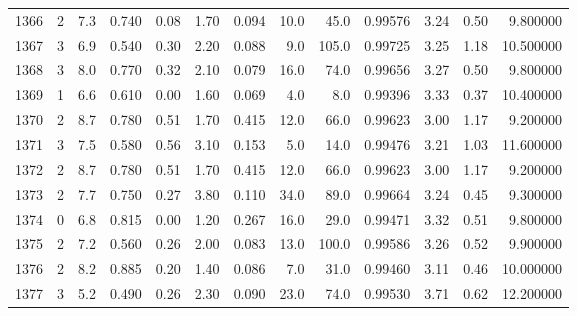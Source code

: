 \begin{tabular}{lrrrrrrrrrrrr}
1366 &        2 &            7.3 &             0.740 &         0.08 &            1.70 &      0.094 &                 10.0 &                  45.0 &  0.99576 &  3.24 &       0.50 &   9.800000 \\
1367 &        3 &            6.9 &             0.540 &         0.30 &            2.20 &      0.088 &                  9.0 &                 105.0 &  0.99725 &  3.25 &       1.18 &  10.500000 \\
1368 &        3 &            8.0 &             0.770 &         0.32 &            2.10 &      0.079 &                 16.0 &                  74.0 &  0.99656 &  3.27 &       0.50 &   9.800000 \\
1369 &        1 &            6.6 &             0.610 &         0.00 &            1.60 &      0.069 &                  4.0 &                   8.0 &  0.99396 &  3.33 &       0.37 &  10.400000 \\
1370 &        2 &            8.7 &             0.780 &         0.51 &            1.70 &      0.415 &                 12.0 &                  66.0 &  0.99623 &  3.00 &       1.17 &   9.200000 \\
1371 &        3 &            7.5 &             0.580 &         0.56 &            3.10 &      0.153 &                  5.0 &                  14.0 &  0.99476 &  3.21 &       1.03 &  11.600000 \\
1372 &        2 &            8.7 &             0.780 &         0.51 &            1.70 &      0.415 &                 12.0 &                  66.0 &  0.99623 &  3.00 &       1.17 &   9.200000 \\
1373 &        2 &            7.7 &             0.750 &         0.27 &            3.80 &      0.110 &                 34.0 &                  89.0 &  0.99664 &  3.24 &       0.45 &   9.300000 \\
1374 &        0 &            6.8 &             0.815 &         0.00 &            1.20 &      0.267 &                 16.0 &                  29.0 &  0.99471 &  3.32 &       0.51 &   9.800000 \\
1375 &        2 &            7.2 &             0.560 &         0.26 &            2.00 &      0.083 &                 13.0 &                 100.0 &  0.99586 &  3.26 &       0.52 &   9.900000 \\
1376 &        2 &            8.2 &             0.885 &         0.20 &            1.40 &      0.086 &                  7.0 &                  31.0 &  0.99460 &  3.11 &       0.46 &  10.000000 \\
1377 &        3 &            5.2 &             0.490 &         0.26 &            2.30 &      0.090 &                 23.0 &                  74.0 &  0.99530 &  3.71 &       0.62 &  12.200000 \\

\end{tabular}
